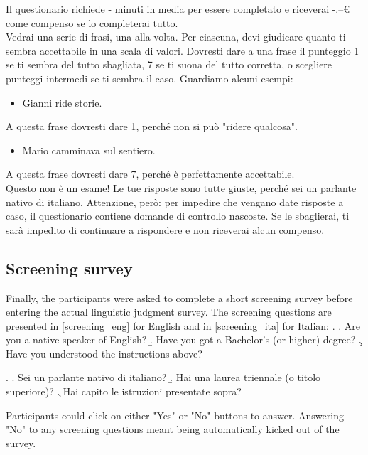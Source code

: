 \begin{kaobox}[frametitle=Instructions for the Italian survey]
Il questionario richiede - minuti in media per essere completato e riceverai -.--€ come compenso se lo completerai tutto.\\
Vedrai una serie di frasi, una alla volta. Per ciascuna, devi giudicare quanto ti sembra accettabile in una scala di valori. Dovresti dare a una frase il punteggio 1 se ti sembra del tutto sbagliata, 7 se ti suona del tutto corretta, o scegliere punteggi intermedi se ti sembra il caso. Guardiamo alcuni esempi:
\begin{itemize}
    \item Gianni ride storie.
\end{itemize}
A questa frase dovresti dare 1, perché non si può "ridere qualcosa".
\begin{itemize}
    \item Mario camminava sul sentiero.
\end{itemize}
A questa frase dovresti dare 7, perché è perfettamente accettabile.\\
Questo non è un esame! Le tue risposte sono tutte giuste, perché sei un parlante nativo di italiano. Attenzione, però: per impedire che vengano date risposte a caso, il questionario contiene domande di controllo nascoste. Se le sbaglierai, ti sarà impedito di continuare a rispondere e non riceverai alcun compenso.
\end{kaobox}

\subsection{Screening survey} 
Finally, the participants were asked to complete a short screening survey before entering the actual linguistic judgment survey. The screening questions are presented in \ref{screening_eng} for English and in \ref{screening_ita} for Italian:
\ex. \label{screening_eng} \a. Are you a native speaker of English?
\b. Have you got a Bachelor's (or higher) degree?
\c. Have you understood the instructions above?

\ex. \label{screening_ita} \a. Sei un parlante nativo di italiano?
\b. Hai una laurea triennale (o titolo superiore)?
\c. Hai capito le istruzioni presentate sopra?

Participants could click on either "Yes" or "No" buttons to answer. Answering "No" to any screening questions meant being automatically kicked out of the survey.

